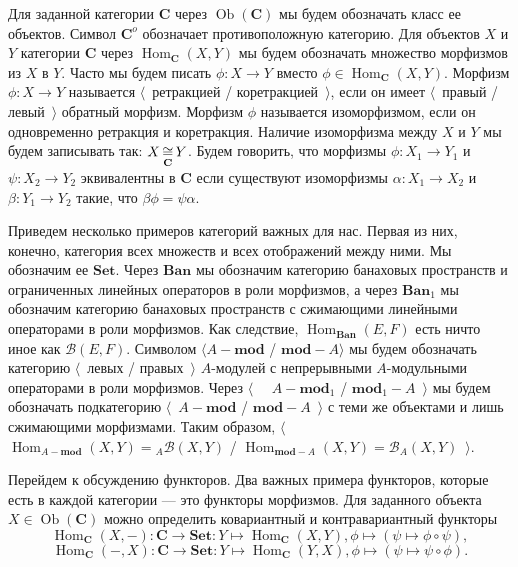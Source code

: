 Для заданной категории $\mathbf{C}$ через $\operatorname{Ob}(\mathbf{C})$ мы будем обозначать класс ее объектов. Символ $\mathbf{C}^o$ обозначает противоположную категорию. Для объектов $X$ и $Y$ категории $\mathbf{C}$ через $\operatorname{Hom}_{\mathbf{C}}(X, Y)$ мы будем обозначать множество морфизмов из $X$ в $Y$. Часто мы будем писать $\phi:X\to Y$ вместо $\phi\in\operatorname{Hom}_{\mathbf{C}}(X,Y)$. Морфизм $\phi:X\to Y$ называется $\langle$~ретракцией / коретракцией~$\rangle$, если он имеет $\langle$~правый / левый~$\rangle$ обратный морфизм. Морфизм $\phi$ называется изоморфизмом, если он одновременно ретракция и коретракция. Наличие изоморфизма между $X$ и $Y$ мы будем записывать так: $X\mathop{\mathbin{\cong}}\limits_{\mathbf{C}} Y$. Будем говорить, что морфизмы $\phi:X_1\to Y_1$ и $\psi:X_2\to Y_2$ эквивалентны в $\mathbf{C}$ если существуют изоморфизмы $\alpha:X_1\to X_2$ и $\beta:Y_1\to Y_2$ такие, что $\beta\phi=\psi\alpha$.

Приведем несколько примеров категорий важных для нас. Первая из них, конечно, категория всех множеств и всех отображений между ними. Мы обозначим ее $\mathbf{Set}$. Через $\mathbf{Ban}$ мы обозначим категорию банаховых пространств и ограниченных линейных операторов в роли морфизмов, а через $\mathbf{Ban}_1$ мы обозначим категорию банаховых пространств с сжимающими линейными операторами в роли морфизмов. Как следствие, $\operatorname{Hom}_{\mathbf{Ban}}(E,F)$ есть ничто иное как $\mathcal{B}(E,F)$. Символом $\langle A-\mathbf{mod}$ / $\mathbf{mod}-A\rangle$ мы будем обозначать категорию $\langle$~левых / правых~$\rangle$ $A$-модулей с непрерывными $A$-модульными операторами в роли морфизмов. Через $\langle$~~ $A-\mathbf{mod}_1$ / $\mathbf{mod}_1-A$~$\rangle$ мы будем обозначать подкатегорию $\langle$~$A-\mathbf{mod}$ / $\mathbf{mod}-A$~$\rangle$ с теми же объектами и лишь сжимающими морфизмами. Таким образом, $\langle$~ $\operatorname{Hom}_{A-\mathbf{mod}}(X,Y)={}_A\mathcal{B}(X,Y)$ /  $\operatorname{Hom}_{\mathbf{mod}-A}(X,Y)=\mathcal{B}_A(X,Y)$~$\rangle$.

Перейдем к обсуждению функторов. Два важных примера функторов, которые есть в каждой категории --- это функторы морфизмов. Для заданного объекта $X\in\operatorname{Ob}(\mathbf{C})$ можно определить ковариантный и контравариантный функторы
$$
\operatorname{Hom}_{\mathbf{C}}(X,-):\mathbf{C}\to\mathbf{Set}:Y\mapsto \operatorname{Hom}_{\mathbf{C}}(X,Y), \phi\mapsto(\psi\mapsto \phi\circ\psi),
$$
$$
\operatorname{Hom}_{\mathbf{C}}(-,X):\mathbf{C}\to\mathbf{Set}:Y\mapsto \operatorname{Hom}_{\mathbf{C}}(Y,X), \phi\mapsto(\psi\mapsto \psi\circ\phi).
$$

